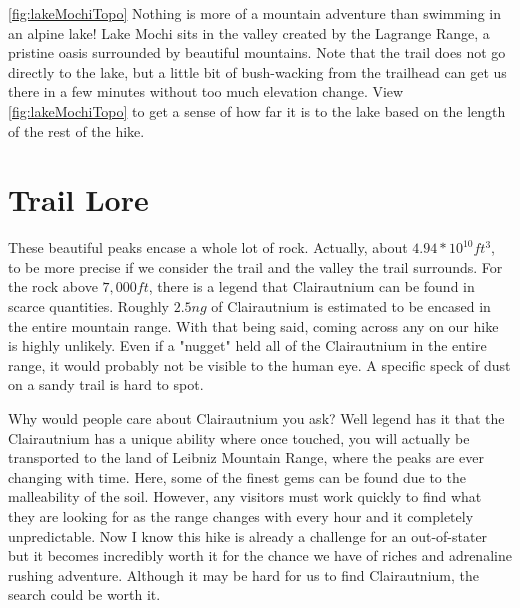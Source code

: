 \documentclass[12pt]{article}   %
\theoremstyle{definition}
\numberwithin{equation}{section}
\begin{document}

\quad \autoref{fig:lakeMochiTopo} Nothing is more of a mountain adventure than swimming in an alpine lake! Lake Mochi sits in the valley created by the Lagrange Range, a pristine oasis surrounded by beautiful mountains. Note that the trail does not go directly to the lake, but a little bit of bush-wacking from the trailhead can get us there in a few minutes without too much elevation change. View \autoref{fig:lakeMochiTopo} to get a sense of how far it is to the lake based on the length of the rest of the hike.

\newpage
\section{Trail Lore} \label{APPM2350proj02sec05}

\quad These beautiful peaks encase a whole lot of rock. Actually, about $4.94*10^{10}ft^3$, to be more precise if we consider the trail and the valley the trail surrounds. For the rock above $7,000ft$, there is a legend that Clairautnium can be found in scarce quantities. Roughly $2.5ng$ of Clairautnium is estimated to be encased in the entire mountain range. With that being said, coming across any on our hike is highly unlikely. Even if a "nugget" held all of the Clairautnium in the entire range, it would probably not be visible to the human eye. A specific speck of dust on a sandy trail is hard to spot.

\quad Why would people care about Clairautnium you ask? Well legend has it that the Clairautnium has a unique ability where once touched, you will actually be transported to the land of Leibniz Mountain Range, where the peaks are ever changing with time. Here, some of the finest gems can be found due to the malleability of the soil. However, any visitors must work quickly to find what they are looking for as the range changes with every hour and it completely unpredictable. Now I know this hike is already a challenge for an out-of-stater but it becomes incredibly worth it for the chance we have of riches and adrenaline rushing adventure. Although it may be hard for us to find Clairautnium, the search could be worth it.
\newpage
\end{document}
